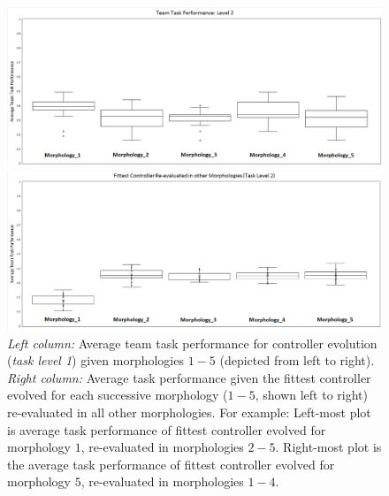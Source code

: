 \begin{figure}[t]
	\begin{minipage}{0.5\textwidth}
		\includegraphics[width=\textwidth]{Evo_BoxPlot_Level2.eps}
	\end{minipage}
	\begin{minipage}{0.5\textwidth}
		\includegraphics[width=\textwidth]{Level2_ReEval.eps}
	\end{minipage}
	\caption{\textit{Left column:} Average team task performance for controller evolution (\textit{task level 1})
		given morphologies $1-5$ (depicted from left to right).
		\textit{Right column:} Average task performance given the fittest controller evolved
		for each successive morphology ($1-5$, shown left to right) re-evaluated in all other morphologies.
		For example: Left-most plot is average task performance of fittest controller evolved for
		morphology $1$, re-evaluated in morphologies $2-5$.  Right-most plot is the average task performance
		of fittest controller evolved for morphology $5$, re-evaluated in morphologies $1-4$.}\label{fig:level2results}
\end{figure}

